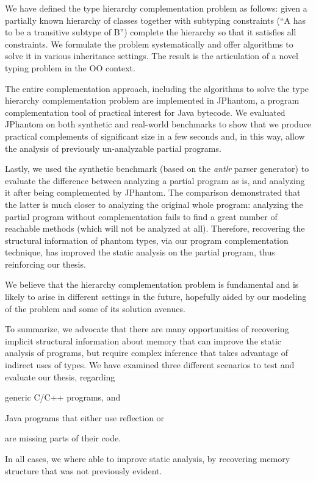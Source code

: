 We have defined the type hierarchy complementation problem as follows:
given a partially known hierarchy of classes together with subtyping
constraints (``A has to be a transitive subtype of B'') complete the
hierarchy so that it satisfies all constraints. We formulate the
problem systematically and offer algorithms to solve it in various
inheritance settings. The result is the articulation of a novel typing
problem in the OO context.

The entire complementation approach, including the algorithms to solve
the type hierarchy complementation problem are implemented in
JPhantom, a program complementation tool of practical interest for
Java bytecode.
%
We evaluated JPhantom on both synthetic and real-world benchmarks to
show that we produce practical complements of significant size in a
few seconds and, in this way, allow the analysis of previously
un-analyzable partial programs.

Lastly, we used the synthetic benchmark (based on the \emph{antlr}
parser generator) to evaluate the difference between analyzing a
partial program as is, and analyzing it after being complemented by
JPhantom. The comparison demonstrated that the latter is much closer
to analyzing the original whole program: analyzing the partial program
without complementation fails to find a great number of reachable
methods (which will not be analyzed at all). Therefore, recovering the
structural information of phantom types, via our program
complementation technique, has improved the static analysis on the
partial program, thus reinforcing our thesis.

We believe that the hierarchy complementation problem is fundamental
and is likely to arise in different settings in the future, hopefully
aided by our modeling of the problem and some of its solution avenues.

To summarize, we advocate that there are many opportunities of
recovering implicit structural information about memory that can
improve the static analysis of programs, but require complex inference
that takes advantage of indirect uses of types. We have examined three
different scenarios to test and evaluate our thesis, regarding
\begin{inparablank}
\item generic C/C++ programs, and
\item Java programs that either use reflection or
\item are missing parts of their code.
\end{inparablank}
In all cases, we where able to improve static analysis, by recovering
memory structure that was not previously evident.

